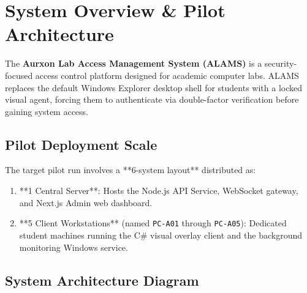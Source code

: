 \documentclass[12pt, a4paper]{report}
\begin{document}
\tableofcontents
\newpage

\chapter{System Overview \& Pilot Architecture}
\label{ch:overview}

The \textbf{Aurxon Lab Access Management System (ALAMS)} is a security-focused access control platform designed for academic computer labs. ALAMS replaces the default Windows Explorer desktop shell for students with a locked visual agent, forcing them to authenticate via double-factor verification before gaining system access.

\section{Pilot Deployment Scale}
The target pilot run involves a **6-system layout** distributed as:
\begin{enumerate}
  \item **1 Central Server**: Hosts the Node.js API Service, WebSocket gateway, and Next.js Admin web dashboard.
  \item **5 Client Workstations** (named \texttt{PC-A01} through \texttt{PC-A05}): Dedicated student machines running the C# visual overlay client and the background monitoring Windows service.
\end{enumerate}

\section{System Architecture Diagram}
\end{document}
